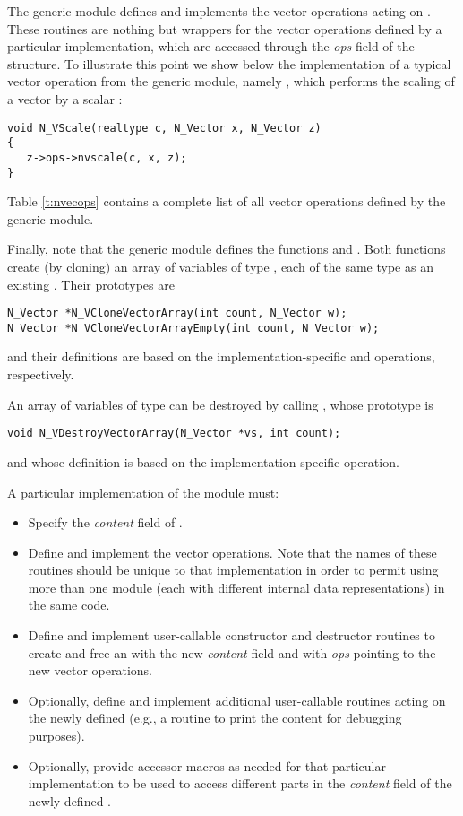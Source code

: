 The generic {\nvector} module defines and implements the vector operations 
acting on .
These routines are nothing but wrappers for the vector operations defined by
a particular {\nvector} implementation, which are accessed through the {\em ops}
field of the  structure. To illustrate this point we
show below the implementation of a typical vector operation from the
generic {\nvector} module, namely , which performs the scaling of a
vector  by a scalar :
\begin{verbatim}
void N_VScale(realtype c, N_Vector x, N_Vector z) 
{
   z->ops->nvscale(c, x, z);
}
\end{verbatim}
Table \ref{t:nvecops} contains a complete list of all vector operations defined
by the generic {\nvector} module.

Finally, note that the generic {\nvector} module defines the functions
 and .  Both functions
create (by cloning) an array of  variables of type , each
of the same type as an existing . Their prototypes are
\begin{verbatim}
N_Vector *N_VCloneVectorArray(int count, N_Vector w);
N_Vector *N_VCloneVectorArrayEmpty(int count, N_Vector w);
\end{verbatim}
and their definitions are based on the implementation-specific  and
 operations, respectively.

An array of variables of type  can be destroyed by
calling , whose prototype is
\begin{verbatim}
void N_VDestroyVectorArray(N_Vector *vs, int count);
\end{verbatim}
and whose definition is based on the implementation-specific  operation.


A particular implementation of the {\nvector} module must:
\begin{itemize}
\item Specify the {\em content} field of .
\item Define and implement the vector operations. 
  Note that the names of these routines should be unique to that implementation in order 
  to permit using more than one {\nvector} module (each with different  
  internal data representations) in the same code.
\item Define and implement user-callable constructor and destructor
  routines to create and free an  with
  the new {\em content} field and with {\em ops} pointing to the
  new vector operations.
\item Optionally, define and implement additional user-callable routines
  acting on the newly defined  (e.g., a routine to print
  the content for debugging purposes).
\item Optionally, provide accessor macros as needed for that particular implementation to 
  be used to access different parts in the {\em content} field of the newly defined .
\end{itemize}

